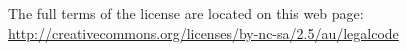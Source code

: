 \begin{flushleft}
The full terms of the license are located on this web page: \url{http://creativecommons.org/licenses/by-nc-sa/2.5/au/legalcode}

\end{flushleft}

% 
% 
% 
% 	
